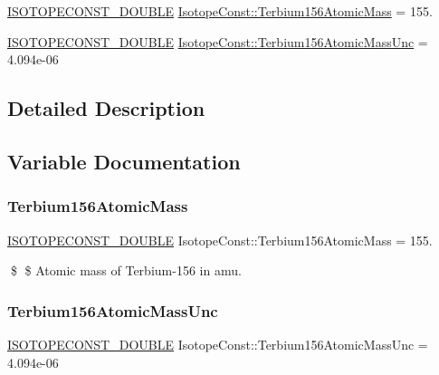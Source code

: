 \begin{DoxyCompactItemize}
\item 
\mbox{\hyperlink{group___isotope_const-_macros_ga8f45a7272ce02c0b4c65c44636ed719a}{I\+S\+O\+T\+O\+P\+E\+C\+O\+N\+S\+T\+\_\+\+D\+O\+U\+B\+LE}} \mbox{\hyperlink{group___isotope_const-_terbium-_tb156_ga47f272a6bc6af0917f1fbc3a30b4f900}{Isotope\+Const\+::\+Terbium156\+Atomic\+Mass}} = 155.
\item 
\mbox{\hyperlink{group___isotope_const-_macros_ga8f45a7272ce02c0b4c65c44636ed719a}{I\+S\+O\+T\+O\+P\+E\+C\+O\+N\+S\+T\+\_\+\+D\+O\+U\+B\+LE}} \mbox{\hyperlink{group___isotope_const-_terbium-_tb156_ga2c47f89d9d3793f2abdfd5de273bd79e}{Isotope\+Const\+::\+Terbium156\+Atomic\+Mass\+Unc}} = 4.\+094e-\/06
\end{DoxyCompactItemize}


\subsection{Detailed Description}


\subsection{Variable Documentation}
\mbox{\label{group___isotope_const-_terbium-_tb156_ga47f272a6bc6af0917f1fbc3a30b4f900}} 
\subsubsection{\texorpdfstring{Terbium156\+Atomic\+Mass}{Terbium156AtomicMass}}
{\footnotesize\ttfamily \mbox{\hyperlink{group___isotope_const-_macros_ga8f45a7272ce02c0b4c65c44636ed719a}{I\+S\+O\+T\+O\+P\+E\+C\+O\+N\+S\+T\+\_\+\+D\+O\+U\+B\+LE}} Isotope\+Const\+::\+Terbium156\+Atomic\+Mass = 155.}

\$ \$ Atomic mass of Terbium-\/156 in amu. \mbox{\label{group___isotope_const-_terbium-_tb156_ga2c47f89d9d3793f2abdfd5de273bd79e}} 
\subsubsection{\texorpdfstring{Terbium156\+Atomic\+Mass\+Unc}{Terbium156AtomicMassUnc}}
{\footnotesize\ttfamily \mbox{\hyperlink{group___isotope_const-_macros_ga8f45a7272ce02c0b4c65c44636ed719a}{I\+S\+O\+T\+O\+P\+E\+C\+O\+N\+S\+T\+\_\+\+D\+O\+U\+B\+LE}} Isotope\+Const\+::\+Terbium156\+Atomic\+Mass\+Unc = 4.\+094e-\/06}

